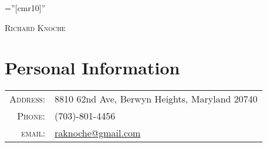 \documentclass[a4paper,10pt]{article}
\begin{document}

\pagestyle{empty} %

\font\fb=''[cmr10]'' %

\par{\centering
		{\Huge \textsc{Richard Knoche}
	}\bigskip\par}

\section{Personal Information}

\begin{tabular}{rl}
    \textsc{Address:}   & 8810 62nd Ave, Berwyn Heights, Maryland 20740 \\
    \textsc{Phone:}     & (703)-801-4456\\
    \textsc{email:}     & \href{mailto:raknoche@gmail.com}{raknoche@gmail.com}
\end{tabular}







\end{document}
